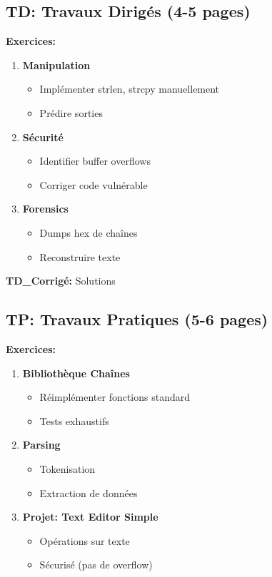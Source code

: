 \documentclass[10pt,a4paper]{article}
\begin{document}
\subsection*{TD: Travaux Dirigés (4-5 pages)}

\textbf{Exercices:}
\begin{enumerate}
\item \textbf{Manipulation}
   \begin{itemize}
   \item Implémenter strlen, strcpy manuellement
   \item Prédire sorties
   \end{itemize}

\item \textbf{Sécurité}
   \begin{itemize}
   \item Identifier buffer overflows
   \item Corriger code vulnérable
   \end{itemize}

\item \textbf{Forensics}
   \begin{itemize}
   \item Dumps hex de chaînes
   \item Reconstruire texte
   \end{itemize}
\end{enumerate}

\textbf{TD\_Corrigé:} Solutions

\subsection*{TP: Travaux Pratiques (5-6 pages)}

\textbf{Exercices:}
\begin{enumerate}
\item \textbf{Bibliothèque Chaînes}
   \begin{itemize}
   \item Réimplémenter fonctions standard
   \item Tests exhaustifs
   \end{itemize}

\item \textbf{Parsing}
   \begin{itemize}
   \item Tokenisation
   \item Extraction de données
   \end{itemize}

\item \textbf{Projet: Text Editor Simple}
   \begin{itemize}
   \item Opérations sur texte
   \item Sécurisé (pas de overflow)
   \end{itemize}
\end{enumerate}
\end{document}
